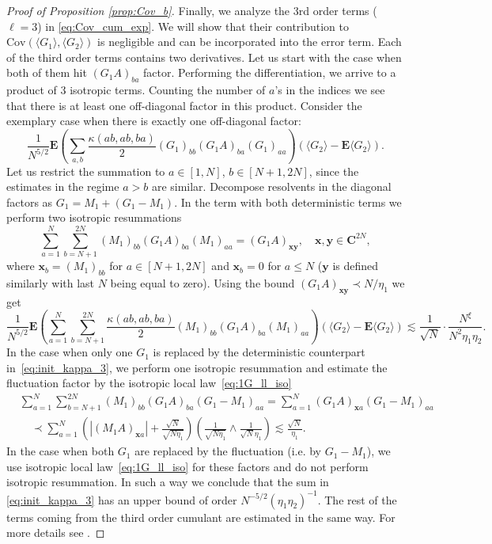 \documentclass[10pt]{amsart}
\numberwithin{equation}{section}
\newcommand{\E}{\mathbf{E}}
\newcommand{\C}{\mathbf{C}}
\newcommand{\Cov}{\mathrm{Cov}}
\begin{document}
\begin{proof}[Proof of Proposition \ref{prop:Cov_b}]
Finally, we analyze the 3rd order terms ($\ell=3$) in \eqref{eq:Cov_cum_exp}. We will show that their contribution to $\Cov(\langle G_1\rangle, \langle G_2\rangle)$ is negligible and can be incorporated into the error term. Each of the third order terms contains two derivatives. Let us start with the case when both of them hit $(G_1A)_{ba}$ factor. Performing the differentiation, we arrive to a product of 3 isotropic terms. Counting the number of $a$'s in the indices we see that there is at least one off-diagonal factor in this product. Consider the exemplary case when there is exactly one off-diagonal factor: 
\begin{equation}
\frac{1}{N^{5/2}} \E\left(\sum_{a,b} \frac{\kappa(ab,ab,ba)}{2}  (G_1)_{bb}(G_1A)_{ba}(G_1)_{aa}\right)\left(\langle G_2\rangle - \E\langle G_2\rangle\right).
\label{eq:init_kappa_3}
\end{equation}
Let us restrict the summation to $a\in [1,N]$, $b\in [N+1,2N]$, since the estimates in the regime $a>b$ are similar. Decompose resolvents in the diagonal factors as $G_1=M_1+(G_1-M_1)$. In the term with both deterministic terms we perform two isotropic resummations
\begin{equation*}
\sum_{a=1}^N\sum_{b=N+1}^{2N}(M_1)_{bb}(G_1A)_{ba}(M_1)_{aa} = (G_1A)_{\bm{x}\bm{y}}, \quad \bm{x},\bm{y}\in\C^{2N},
\end{equation*}
where $\bm{x}_b=(M_1)_{bb}$ for $a\in[N+1,2N]$ and $\bm{x}_b=0$ for $a\le N$ ($\bm{y}$ is defined similarly with last $N$ being equal to zero). Using the bound $(G_1A)_{\bm{x}\bm{y}}\prec N/\eta_1$ we get
\begin{equation*}
\frac{1}{N^{5/2}} \E\left(\sum_{a=1}^N\sum_{b=N+1}^{2N} \frac{\kappa(ab,ab,ba)}{2}  (M_1)_{bb}(G_1A)_{ba}(M_1)_{aa}\right)\left(\langle G_2\rangle - \E\langle G_2\rangle\right)\lesssim \frac{1}{\sqrt{N}}\cdot \frac{N^\xi}{N^2\eta_1\eta_2}.
\end{equation*}
In the case when only one $G_1$ is replaced by the deterministic counterpart in~\eqref{eq:init_kappa_3}, we perform one isotropic resummation and estimate the fluctuation factor by the isotropic local law~\eqref{eq:1G_ll_iso}
\begin{equation*}
\begin{split}
&\sum_{a=1}^N\sum_{b=N+1}^{2N}(M_1)_{bb}(G_1A)_{ba}(G_1-M_1)_{aa} = \sum_{a=1}^N(G_1A)_{\bm{x}a}(G_1-M_1)_{aa}\\
&\quad\prec \sum_{a=1}^N \left( \left\vert(M_1A)_{\bm{x}a}\right\vert + \frac{\sqrt{N}}{\sqrt{N\eta_1}}\right)\left(\frac{1}{\sqrt{N\eta_1}}\wedge \frac{1}{\sqrt{N}\eta_1}\right)\lesssim \frac{\sqrt{N}}{\eta_1}. 
\end{split}
\end{equation*}
In the case when both $G_1$ are replaced by the fluctuation (i.e. by $G_1-M_1$), we use isotropic local law~\eqref{eq:1G_ll_iso} for these factors and do not perform isotropic resummation. In such a way we conclude that the sum in \eqref{eq:init_kappa_3} has an upper bound of order $N^{-5/2}(\eta_1\eta_2)^{-1}$. The rest of the terms coming from the third order cumulant are estimated in the same way. For more details see \cite[Eq. (6.35)-(6.36)]{macroCLT_complex}.



\end{proof}
\end{document}
